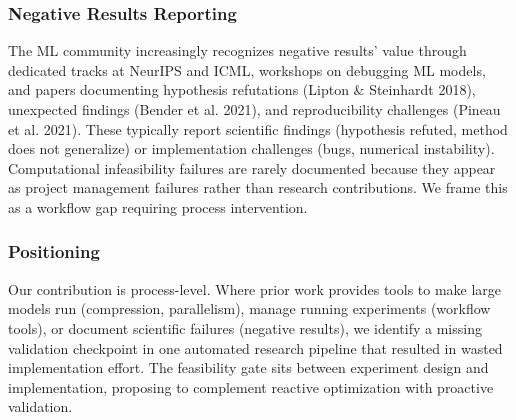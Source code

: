 \subsubsection{Negative Results Reporting}

The ML community increasingly recognizes negative results' value through dedicated tracks at NeurIPS and ICML, workshops on debugging ML models, and papers documenting hypothesis refutations (Lipton \& Steinhardt 2018), unexpected findings (Bender et al. 2021), and reproducibility challenges (Pineau et al. 2021). These typically report scientific findings (hypothesis refuted, method does not generalize) or implementation challenges (bugs, numerical instability). Computational infeasibility failures are rarely documented because they appear as project management failures rather than research contributions. We frame this as a workflow gap requiring process intervention.

\subsubsection{Positioning}

Our contribution is process-level. Where prior work provides tools to make large models run (compression, parallelism), manage running experiments (workflow tools), or document scientific failures (negative results), we identify a missing validation checkpoint in one automated research pipeline that resulted in wasted implementation effort. The feasibility gate sits between experiment design and implementation, proposing to complement reactive optimization with proactive validation.

